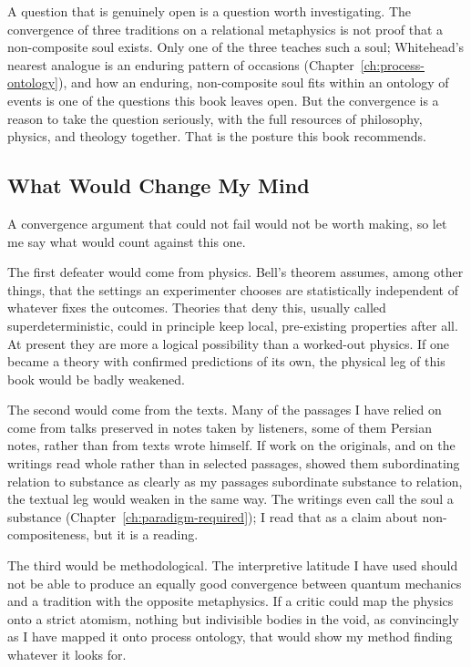 A question that is genuinely open is a question worth investigating.  The
convergence of three traditions on a relational metaphysics is not proof that
a non-composite soul exists.  Only one of the three teaches such a soul;
Whitehead's nearest analogue is an enduring pattern of occasions
(Chapter~\ref{ch:process-ontology}), and how an enduring, non-composite soul
fits within an ontology of events is one of the questions this book leaves
open.  But the convergence is a reason to take the question seriously, with
the full resources of philosophy, physics, and theology together.  That is the
posture this book recommends.

\subsection*{What Would Change My Mind}

A convergence argument that could not fail would not be worth making, so let
me say what would count against this one.

The first defeater would come from physics.  Bell's theorem assumes, among
other things, that the settings an experimenter chooses are statistically
independent of whatever fixes the outcomes.  Theories that deny this, usually
called superdeterministic, could in principle keep local, pre-existing
properties after all.  At present they are more a logical possibility than a
worked-out physics.  If one became a theory with confirmed predictions of its
own, the physical leg of this book would be badly weakened.

The second would come from the texts.  Many of the passages I have relied on
come from talks preserved in notes taken by listeners, some of them Persian
notes, rather than from texts \AbdulBaha wrote himself.  If work on the
originals, and on the writings read whole rather than in selected passages,
showed them subordinating relation to substance as clearly as my passages
subordinate substance to relation, the textual leg would weaken in the same
way.  The writings even call the soul a substance
(Chapter~\ref{ch:paradigm-required}); I read that as a claim about
non-compositeness, but it is a reading.

The third would be methodological.  The interpretive latitude I have used
should not be able to produce an equally good convergence between quantum
mechanics and a tradition with the opposite metaphysics.  If a critic could
map the physics onto a strict atomism, nothing but indivisible bodies in the
void, as convincingly as I have mapped it onto process ontology, that would
show my method finding whatever it looks for.

